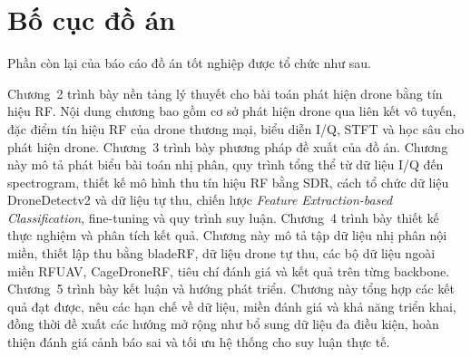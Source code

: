 \documentclass[../DoAn.tex]{subfiles}
\begin{document}
\section{Bố cục đồ án}

Phần còn lại của báo cáo đồ án tốt nghiệp được tổ chức như sau.

Chương~2 trình bày nền tảng lý thuyết cho bài toán phát hiện drone bằng tín hiệu RF. Nội dung chương bao gồm cơ sở phát hiện drone qua liên kết vô tuyến, đặc điểm tín hiệu RF của drone thương mại, biểu diễn I/Q, STFT và học sâu cho phát hiện drone. Chương~3 trình bày phương pháp đề xuất của đồ án. Chương này mô tả phát biểu bài toán nhị phân, quy trình tổng thể từ dữ liệu I/Q đến spectrogram, thiết kế mô hình thu tín hiệu RF bằng SDR, cách tổ chức dữ liệu DroneDetectv2 và dữ liệu tự thu, chiến lược \textit{Feature Extraction-based Classification}, fine-tuning và quy trình suy luận. Chương~4 trình bày thiết kế thực nghiệm và phân tích kết quả. Chương này mô tả tập dữ liệu nhị phân nội miền, thiết lập thu bằng bladeRF, dữ liệu drone tự thu, các bộ dữ liệu ngoài miền RFUAV, CageDroneRF, tiêu chí đánh giá và kết quả trên từng backbone. Chương~5 trình bày kết luận và hướng phát triển. Chương này tổng hợp các kết quả đạt được, nêu các hạn chế về dữ liệu, miền đánh giá và khả năng triển khai, đồng thời đề xuất các hướng mở rộng như bổ sung dữ liệu đa điều kiện, hoàn thiện đánh giá cảnh báo sai và tối ưu hệ thống cho suy luận thực tế.
\end{document}
